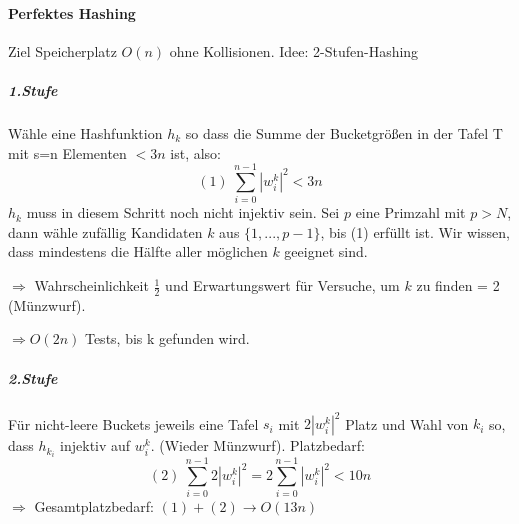 \paragraph{Perfektes Hashing} Ziel Speicherplatz $ O(n) $ ohne Kollisionen. Idee: 2-Stufen-Hashing

\subparagraph{1.Stufe} Wähle eine Hashfunktion $ h_k $ so dass die Summe der Bucketgrößen in der Tafel T mit s=n Elementen $ < 3n $ ist, also:
\[ (1)\ \sum_{i=0}^{n-1} |w_i^k|^2 < 3n\]
$ h_k $ muss in diesem Schritt noch nicht injektiv sein. Sei $ p $ eine Primzahl mit $ p>N $, dann wähle zufällig Kandidaten $ k $ aus $\{1,...,p-1\}$, bis (1) erfüllt ist. Wir wissen, dass mindestens die Hälfte aller möglichen $ k $ geeignet sind. 

$ \Rightarrow $ Wahrscheinlichkeit $ \frac{1}{2} $ und Erwartungswert für Versuche, um $ k $ zu finden = 2 (Münzwurf).

$ \Rightarrow O(2n)$ Tests, bis k gefunden wird.

\subparagraph{2.Stufe} Für nicht-leere Buckets jeweils eine Tafel $ s_i $ mit $ 2|w_i^k|^2 $ Platz und Wahl von $ k_i $ so, dass $ h_{k_i} $ injektiv auf $ w_i^k $. (Wieder Münzwurf). Platzbedarf: 
\[ (2)\ \sum_{i=0}^{n-1} 2|w_i^k|^2 = 2\sum_{i=0}^{n-1} |w_i^k|^2 < 10n \]
$ \Rightarrow $ Gesamtplatzbedarf: $ (1) + (2) \rightarrow O(13n)$ 





















